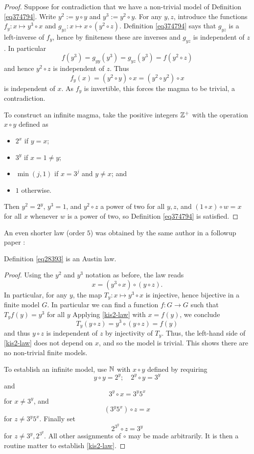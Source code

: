 \begin{proof} \leanok Suppose for contradiction that we have a non-trivial model of Definition \ref{eq374794}. Write $y^2 := y \circ y$ and $y^3 := y^2 \circ y$. For any $y,z$, introduce the functions $f_y: x \mapsto y^3 \circ x$ and $g_{yz}: x \mapsto x \circ (y^2 \circ z)$.  Definition \ref{eq374794} says that $g_{yz}$ is a left-inverse of $f_y$, hence by finiteness these are inverses and $g_{yz}$ is independent of $z$. In particular
$$ f(y^3) = g_{yy}(y^3) = g_{yz}(y^3) = f(y^2 \circ z)$$
and hence $y^2 \circ z$ is independent of $z$.  Thus
$$ f_y(x) = (y^2 \circ y) \circ x = (y^2 \circ y^2) \circ x$$
is independent of $x$.  As $f_y$ is invertible, this forces the magma to be trivial, a contradiction.

To construct an infinite magma, take the positive integers $\mathbb{Z}^+$ with the operation $x \circ y$ defined as
\begin{itemize}
  \item $2^x$ if $y=x$;
  \item $3^y$ if $x = 1 \neq y$;
  \item $\min(j,1)$ if $x=3^j$ and $y \neq x$; and
  \item $1$ otherwise.
\end{itemize}
Then $y^2 = 2^y$, $y^3 = 1$, and $y^2 \circ z$ a power of two for all $y, z$, and $(1 \circ x) \circ w = x$ for all $x$ whenever $w$ is a power of two, so Definition \ref{eq374794} is satisfied.
\end{proof}

An even shorter law (order $5$) was obtained by the same author in a followup paper \cite{Kisielewicz2}:

\begin{theorem}\label{kis-thm2} Definition \ref{eq28393} is an Austin law.
\end{theorem}

\begin{proof} Using the $y^2$ and $y^3$ notation as before, the law reads
\begin{equation}\label{kis2-law}
   x = (y^3 \circ x) \circ (y \circ z).
  \end{equation}
In particular, for any $y$, the map $T_y \colon x \mapsto y^3 \circ x$ is injective, hence bijective in a finite model $G$.  In particular we can find a function $f : G \to G$ such that $T_y f(y) = y^3$ for all $y$  Applying \eqref{kis2-law} with $x = f(y)$, we conclude
$$ T_y(y \circ z) = y^3 \circ (y \circ z) = f(y) $$
and thus $y \circ z$ is independent of $z$ by injectivity of $T_y$.  Thus, the left-hand side of \eqref{kis2-law} does not depend on $x$, and so the model is trivial.  This shows there are no non-trivial finite models.

To establish an infinite model, use $\mathbb{N}$ with $x \circ y$ defined by requiring
$$ y \circ y = 2^y; \quad 2^y \circ y = 3^y$$
and
$$ 3^y \circ x = 3^y 5^x$$
for $x \neq 3^y$, and
$$ (3^y 5^x) \circ z = x$$
for $z \neq 3^y 5^x$.  Finally set
$$ 2^{3^y} \circ z = 3^y$$
for $z \neq 3^y, 2^{3^y}$.  All other assignments of $\circ$ may be made arbitrarily. It is then a routine matter to establish \eqref{kis2-law}.
\end{proof}

